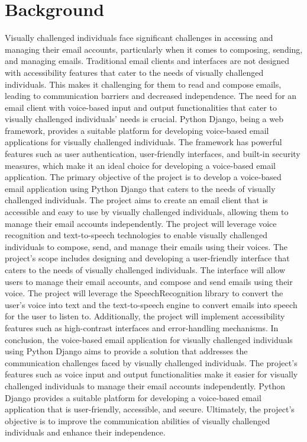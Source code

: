 \documentclass[12pt]{report}
\begin{document}
\section{Background}
Visually challenged individuals face significant challenges in accessing and managing their email accounts, particularly when it comes to composing, sending, and managing emails. Traditional email clients and interfaces are not designed with accessibility features that cater to the needs of visually challenged individuals. This makes it challenging for them to read and compose emails, leading to communication barriers and decreased independence. The need for an email client with voice-based input and output functionalities that cater to visually challenged individuals' needs is crucial. \newline \newline
Python Django, being a web framework, provides a suitable platform for developing voice-based email applications for visually challenged individuals. The framework has powerful features such as user authentication, user-friendly interfaces, and built-in security measures, which make it an ideal choice for developing a voice-based email application.\newline \newline
The primary objective of the project is to develop a voice-based email application using Python Django that caters to the needs of visually challenged individuals. The project aims to create an email client that is accessible and easy to use by visually challenged individuals, allowing them to manage their email accounts independently. The project will leverage voice recognition and text-to-speech technologies to enable visually challenged individuals to compose, send, and manage their emails using their voices.\newline \newline
The project's scope includes designing and developing a user-friendly interface that caters to the needs of visually challenged individuals. The interface will allow users to manage their email accounts, and compose and send emails using their voice. The project will leverage the SpeechRecognition library to convert the user's voice into text and the text-to-speech engine to convert emails into speech for the user to listen to. Additionally, the project will implement accessibility features such as high-contrast interfaces and error-handling mechanisms.\newline \newpage
In conclusion, the voice-based email application for visually challenged individuals using Python Django aims to provide a solution that addresses the communication challenges faced by visually challenged individuals. The project's features such as voice input and output functionalities make it easier for visually challenged individuals to manage their email accounts independently. Python Django provides a suitable platform for developing a voice-based email application that is user-friendly, accessible, and secure. Ultimately, the project's objective is to improve the communication abilities of visually challenged individuals and enhance their independence.
\end{document}

